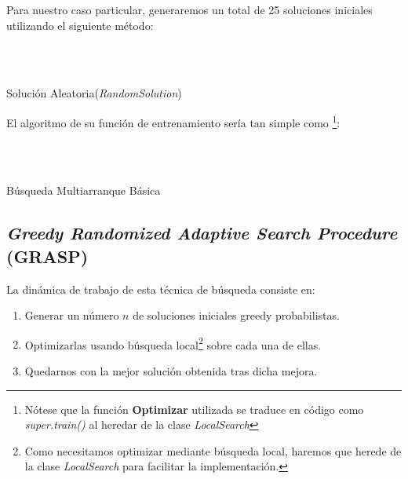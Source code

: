 \documentclass[a4paper, 11pt]{article}
\begin{document}
			Para nuestro caso particular, generaremos un total de 25 soluciones iniciales utilizando
			el siguiente método:
			
			\begin{algorithm}[H]
				\begin{algorithmic}[1]
				\REQUIRE \ \\
						 \
					\ENDIF
				\ENDFOR
				\end{algorithmic}
			\caption{Solución Aleatoria(\textit{RandomSolution})}
			\label{RandomSolution}
			\end{algorithm}
			
			El algoritmo de su función de entrenamiento sería tan simple como \footnote{Nótese que la
			función \textbf{Optimizar} utilizada se traduce en código como \textit{super.train()} al
			heredar de la clase \textit{LocalSearch}}:
			
			\begin{algorithm}[H]
				\begin{algorithmic}[1]
				\REQUIRE \ \\
						 \
				\STATE{\texttt{i++}}
					\STATE{\texttt{Solución\_actual}.Optimizar()}
					\ENDIF
				\ENDFOR
			\end{algorithmic}
		\caption{Búsqueda Multiarranque Básica}
		\label{BMBS}
		\end{algorithm}

		\subsection{\textit{Greedy Randomized Adaptive Search Procedure} (\textbf{GRASP})}
			La dinámica de trabajo de esta técnica de búsqueda consiste en:
			\begin{enumerate}
				\item Generar un número $n$ de soluciones iniciales greedy probabilistas.
				\item Optimizarlas usando búsqueda local\footnote{Como necesitamos optimizar mediante
				búsqueda local, haremos que herede de la clase \textit{LocalSearch} para facilitar
				la implementación.} sobre cada una de ellas.
				\item Quedarnos con la mejor solución obtenida tras dicha mejora.
			\end{enumerate}
			
\end{document}

